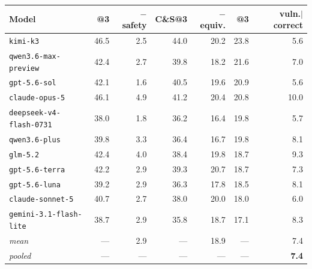 \begin{tabular}{lrrrrrr}
\toprule
Model & \pass{}@3 & $-$safety & C\&S@3 & $-$equiv. & \usable{}@3 & vuln.$\mid$correct \\
\midrule
\texttt{kimi-k3} & 46.5 & 2.5 & 44.0 & 20.2 & 23.8 & 5.6 \\
\texttt{qwen3.6-max-preview} & 42.4 & 2.7 & 39.8 & 18.2 & 21.6 & 7.0 \\
\texttt{gpt-5.6-sol} & 42.1 & 1.6 & 40.5 & 19.6 & 20.9 & 5.6 \\
\texttt{claude-opus-5} & 46.1 & 4.9 & 41.2 & 20.4 & 20.8 & 10.0 \\
\texttt{deepseek-v4-flash-0731} & 38.0 & 1.8 & 36.2 & 16.4 & 19.8 & 5.7 \\
\texttt{qwen3.6-plus} & 39.8 & 3.3 & 36.4 & 16.7 & 19.8 & 8.1 \\
\texttt{glm-5.2} & 42.4 & 4.0 & 38.4 & 19.8 & 18.7 & 9.3 \\
\texttt{gpt-5.6-terra} & 42.2 & 2.9 & 39.3 & 20.7 & 18.7 & 7.3 \\
\texttt{gpt-5.6-luna} & 39.2 & 2.9 & 36.3 & 17.8 & 18.5 & 8.1 \\
\texttt{claude-sonnet-5} & 40.7 & 2.7 & 38.0 & 20.0 & 18.0 & 6.0 \\
\texttt{gemini-3.1-flash-lite} & 38.7 & 2.9 & 35.8 & 18.7 & 17.1 & 8.3 \\
\midrule
\textit{mean} & --- & 2.9 & --- & 18.9 & --- & 7.4 \\
\textit{pooled} & --- & --- & --- & --- & --- & \textbf{7.4} \\
\bottomrule
\end{tabular}

